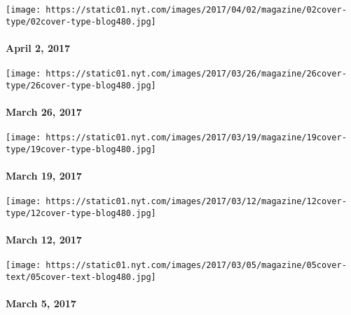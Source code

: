 \href{https://www.nytimes.com/issue/magazine/2017/03/31/magazine-index-20170402}{}

\texttt{[image: https://static01.nyt.com/images/2017/04/02/magazine/02cover-type/02cover-type-blog480.jpg]}

\hypertarget{april-2-2017}{%
\paragraph{April 2, 2017}\label{april-2-2017}}

\href{https://www.nytimes.com/issue/magazine/2017/03/24/magazine-index-20170326}{}

\texttt{[image: https://static01.nyt.com/images/2017/03/26/magazine/26cover-type/26cover-type-blog480.jpg]}

\hypertarget{march-26-2017}{%
\paragraph{March 26, 2017}\label{march-26-2017}}

\href{https://www.nytimes.com/issue/magazine/2017/03/17/31917-20170319}{}

\texttt{[image: https://static01.nyt.com/images/2017/03/19/magazine/19cover-type/19cover-type-blog480.jpg]}

\hypertarget{march-19-2017}{%
\paragraph{March 19, 2017}\label{march-19-2017}}

\href{https://www.nytimes.com/interactive/2017/03/09/magazine/25-songs-that-tell-us-where-music-is-going.html}{}

\texttt{[image: https://static01.nyt.com/images/2017/03/12/magazine/12cover-type/12cover-type-blog480.jpg]}

\hypertarget{march-12-2017}{%
\paragraph{March 12, 2017}\label{march-12-2017}}

\href{https://www.nytimes.com/issue/magazine/2017/03/03/magazine-index-20170305}{}

\texttt{[image: https://static01.nyt.com/images/2017/03/05/magazine/05cover-text/05cover-text-blog480.jpg]}

\hypertarget{march-5-2017}{%
\paragraph{March 5, 2017}\label{march-5-2017}}

